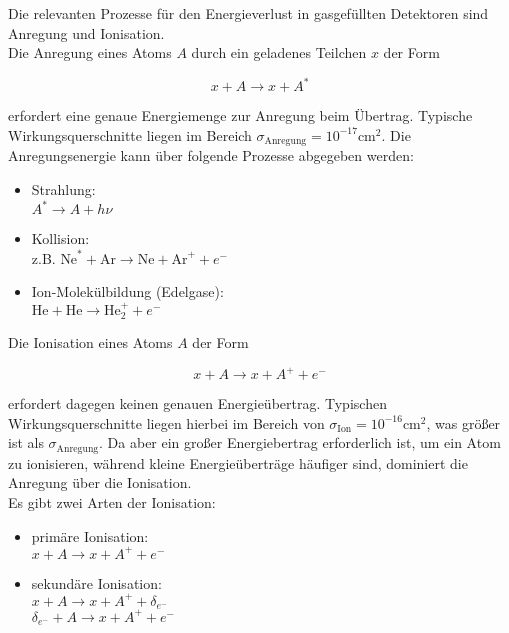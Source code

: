 Die relevanten Prozesse für den Energieverlust in gasgefüllten Detektoren sind Anregung und
Ionisation.
\\
Die Anregung eines Atoms $A$ durch ein geladenes Teilchen $x$ der Form

\[x+A \longrightarrow x+ A^*\]

erfordert eine genaue Energiemenge zur Anregung beim Übertrag. Typische Wirkungsquerschnitte liegen
im Bereich $\sigma_{\text{Anregung}}=10^{-17}\text{cm}^2$. Die Anregungsenergie kann über folgende Prozesse
abgegeben werden:

\begin{itemize}
  \item Strahlung:\\ $A^*\longrightarrow A+h\nu$
  \item Kollision:\\ z.B. $\text{Ne}^*+\text{Ar}\longrightarrow \text{Ne}+\text{Ar}^++e^-$
  \item Ion-Molekülbildung (Edelgase):\\ $\text{He}+\text{He} \longrightarrow\text{He}^+_2+e^-$
\end{itemize}

Die Ionisation eines Atoms $A$ der Form

\[x+A \longrightarrow x+ A^+ +e^- \]

erfordert dagegen keinen genauen Energieübertrag. Typischen Wirkungsquerschnitte liegen hierbei im
Bereich von $\sigma_{\text{Ion}}=10^{-16}\text{cm}^2$, was größer ist als
$\sigma_{\text{Anregung}}$. Da aber ein großer Energiebertrag erforderlich ist, um ein Atom zu
ionisieren, während kleine Energieüberträge häufiger sind, dominiert die Anregung über die Ionisation.
\\
Es gibt zwei Arten der Ionisation:

\begin{itemize}
  \item primäre Ionisation:\\ $x+A \longrightarrow x+A^++e^-$
  \item sekundäre Ionisation:\\ $x+A \longrightarrow x+A^++\delta_{e^-}$ \\ $\delta_{e^-}+A \longrightarrow
  x+A^++e^-$
\end{itemize}
